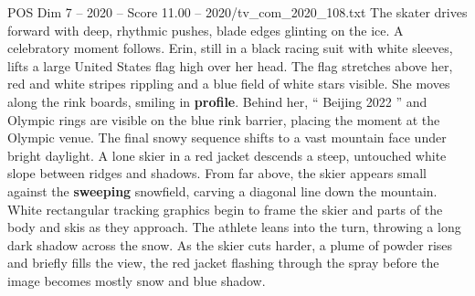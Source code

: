 \begin{textsample}{POS Dim 7 – 2020 – Score 11.00 – 2020/tv\_com\_2020\_108.txt}
The skater drives forward with deep, rhythmic pushes, blade edges glinting on the ice.
A celebratory moment follows.
Erin, still in a black racing suit with white sleeves, lifts a large United States flag high over her head.
The flag stretches above her, red and white stripes rippling and a blue field of white stars visible.
She moves along the rink boards, smiling in \textbf{profile}.
Behind her, “ Beijing 2022 ” and Olympic rings are visible on the blue rink barrier, placing the moment at the Olympic venue.
The final snowy sequence shifts to a vast mountain face under bright daylight.
A lone skier in a red jacket descends a steep, untouched white slope between ridges and shadows.
From far above, the skier appears small against the \textbf{sweeping} snowfield, carving a diagonal line down the mountain.
White rectangular tracking graphics begin to frame the skier and parts of the body and skis as they approach.
The athlete leans into the turn, throwing a long dark shadow across the snow.
As the skier cuts harder, a plume of powder rises and briefly fills the view, the red jacket flashing through the spray before the image becomes mostly snow and blue shadow.

\end{textsample}

